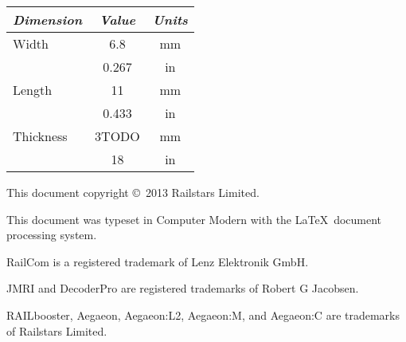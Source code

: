 \documentclass[12pt,letterpaper,draft]{memoir} %
\begin{document}
\begin{center}
\begin{tabular}{|l|c|c|}
\hline
\textit{Dimension} & \textit{Value} & \textit{Units}\\ \hline
Width & 6.8 & mm \\
       &0.267 & in \\ \hline
Length & 11 & mm \\
       & 0.433 & in \\ \hline
Thickness & 3TODO & mm \\
          & 18 & in \\ \hline
\end{tabular}
\end{center}

\printindex

\newpage

This document copyright \copyright \ 2013 Railstars Limited.

This document was typeset in Computer Modern with the \LaTeX \ document processing system.

RailCom\textsuperscript{\textregistered} is a registered trademark of Lenz Elektronik GmbH.

JMRI\textsuperscript{\textregistered} and DecoderPro\textsuperscript{\textregistered} are registered trademarks of Robert G Jacobsen.

RAILbooster\textsuperscript{\texttrademark}, Aegaeon\textsuperscript{\texttrademark}, Aegaeon:L2\textsuperscript{\texttrademark}, Aegaeon:M\textsuperscript{\texttrademark}, and Ae\-gae\-on:C\textsuperscript{\texttrademark}  are trademarks of Railstars Limited.
\end{document}
